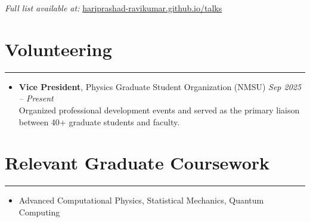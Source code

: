 \documentclass[11pt]{article}
\begin{document}
\noindent\textit{Full list available at:} \href{https://hariprashad-ravikumar.github.io/talks}{hariprashad-ravikumar.github.io/talks}


\section*{Volunteering}
\hrule
\vspace{-0.3em}
\begin{itemize}
    \item \textbf{Vice President}, Physics Graduate Student Organization (NMSU)  \hfill \textit{Sep 2025 -- Present} \\ Organized professional development events and served as the primary liaison between 40+ graduate students and faculty.
    
\end{itemize}

\section*{Relevant Graduate Coursework}
\hrule
\vspace{-0.3em}
\begin{itemize}
    \item Advanced Computational Physics, Statistical Mechanics, Quantum Computing
\end{itemize}
\end{document}
